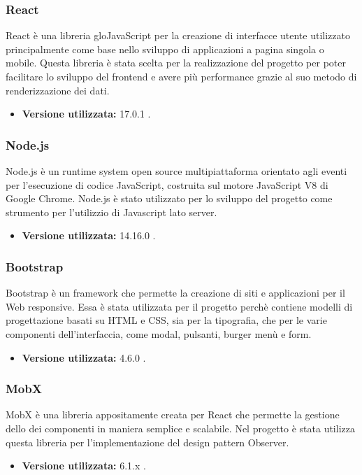 \subsubsection{React}
React è una libreria glo{JavaScript} per la creazione di interfacce utente utilizzato principalmente come base nello sviluppo di applicazioni a pagina singola o mobile.
Questa libreria è stata scelta per la realizzazione del progetto per poter facilitare lo sviluppo del frontend e avere più performance grazie al suo metodo di renderizzazione dei dati.
\begin{itemize}
\item \textbf{Versione utilizzata:} 17.0.1 .
\end{itemize}
\subsubsection{Node.js}
Node.js è un runtime system open source multipiattaforma orientato agli eventi per l'esecuzione di codice JavaScript, costruita sul motore JavaScript V8 di Google Chrome.
Node.js è stato utilizzato per lo sviluppo del progetto \NomeProgetto{} come strumento per l'utilizzio di Javascript lato server.
\begin{itemize}
\item \textbf{Versione utilizzata:} 14.16.0 .
\end{itemize}
\subsubsection{Bootstrap}
Bootstrap è un framework che permette la creazione di siti e applicazioni per il Web responsive. Essa è stata utilizzata per il progetto perchè contiene modelli di progettazione basati su HTML e CSS, sia per la tipografia, che per le varie componenti dell'interfaccia, come modal, pulsanti, burger menù e form.
\begin{itemize}
\item \textbf{Versione utilizzata:} 4.6.0 .
\end{itemize}
\subsubsection{MobX}
MobX è una libreria appositamente creata per React che permette la gestione dello  dei componenti in maniera semplice e scalabile. Nel progetto \NomeProgetto{} è stata utilizza questa libreria per l'implementazione del design pattern Observer.
\begin{itemize}
\item \textbf{Versione utilizzata:} 6.1.x .
\end{itemize}
